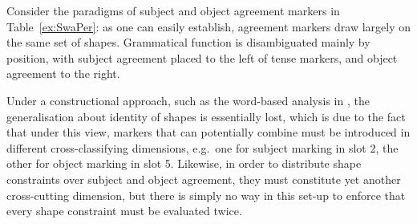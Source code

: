 \documentclass[output=paper
 	        ,biblatex
                ,babelshorthands
                ,newtxmath
                ,draftmode
                ,colorlinks, citecolor=brown
]{langscibook}
\begin{document}
\begin{exe}
\begin{xlist}
\begin{exe}
\begin{xlist}
\begin{table}[hbt]
\end{table}

Consider the paradigms of  subject and object agreement markers
in Table~\ref{ex:SwaPer}: as one can easily establish, agreement
markers draw largely on the same set of shapes. Grammatical function
is disambiguated mainly by position, with subject agreement placed 
to the left of tense markers, and object agreement to the right. 

Under a constructional approach, such as the word-based analysis in
\citet{Koenig99}, the generalisation about identity of shapes is
essentially lost, which is due to the fact that under this view,
markers that can potentially combine must be introduced in different
cross-classifying dimensions, e.g.\ one for subject marking in slot 2,
the other for object marking in slot 5. Likewise, in order to
distribute shape constraints over subject and object agreement, they
must constitute yet another cross-cutting dimension, but there is
simply no way in this set-up to enforce that every shape constraint
must be evaluated twice.   


\end{xlist}
\end{exe}
\end{xlist}
\end{exe}
\end{document}
